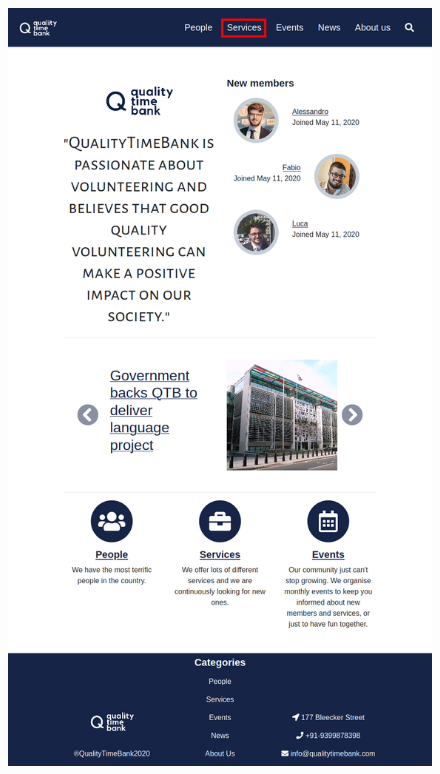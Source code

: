 \documentclass[a4paper, 11pt, parskip=half, headsepline]{scrreprt}
\begin{document}
\begin{figure}[H]
    \begin{minipage}[t]{0.45\textwidth}
        \centering
    	\includegraphics[width=1\linewidth, keepaspectratio]{scenarios/scenario-11}
    	\caption{}
    	\label{fig:scenario-11}
    \end{minipage}
    \hspace*{\fill}
    \begin{minipage}[t]{0.5\textwidth}
        \centering

\end{minipage}
\end{figure}
\end{document}
